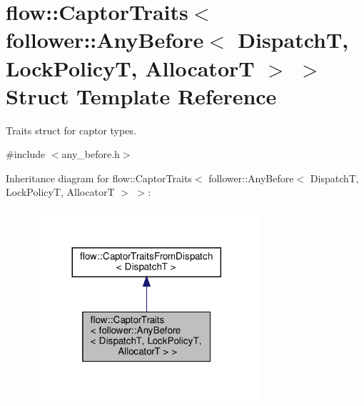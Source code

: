 \hypertarget{structflow_1_1_captor_traits_3_01follower_1_1_any_before_3_01_dispatch_t_00_01_lock_policy_t_00_01_allocator_t_01_4_01_4}{}\section{flow\+:\+:Captor\+Traits$<$ follower\+:\+:Any\+Before$<$ DispatchT, Lock\+PolicyT, AllocatorT $>$ $>$ Struct Template Reference}
\label{structflow_1_1_captor_traits_3_01follower_1_1_any_before_3_01_dispatch_t_00_01_lock_policy_t_00_01_allocator_t_01_4_01_4}


Traits struct for captor types.  




{\ttfamily \#include $<$any\+\_\+before.\+h$>$}



Inheritance diagram for flow\+:\+:Captor\+Traits$<$ follower\+:\+:Any\+Before$<$ DispatchT, Lock\+PolicyT, AllocatorT $>$ $>$\+:\nopagebreak
\begin{figure}[H]
\begin{center}
\leavevmode
\includegraphics[width=236pt]{structflow_1_1_captor_traits_3_01follower_1_1_any_before_3_01_dispatch_t_00_01_lock_policy_t_00_2a451203725555ae62bdb63cc0472d55}
\end{center}
\end{figure}


